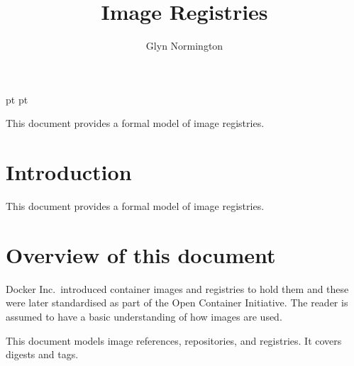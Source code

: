 \documentclass[a4paper,twoside,12pt]{article}
\begin{document}
 pt
 pt

\def\Slash{\slash\hspace{0pt}}

\title{Image Registries}

\author{Glyn Normington}

\maketitle
\thispagestyle{empty}
\setcounter{page}{1}


This document provides a formal model of image registries.


\newcommand{\true}{true}
\newcommand{\false}{false}
\renewcommand{\emptyset}{\varnothing}

\clearpage
\tableofcontents

\cleardoublepage
{}
\setcounter{page}{1}

\section{Introduction}

This document provides a formal model of image registries.

\section{Overview of this document}

Docker Inc.\ introduced container images and registries to hold them and these were later standardised as part of the Open Container Initiative. The reader is assumed to have a basic understanding of how images are used.

This document models image references, repositories, and registries. It covers digests and tags.
\end{document}
